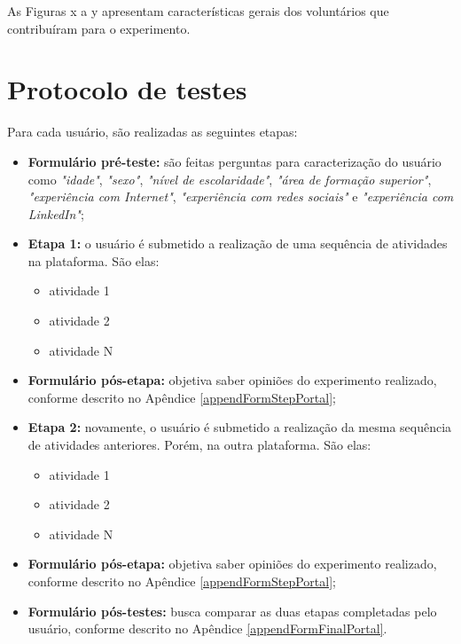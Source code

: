 \documentclass[cic,tc]{iiufrgs}
\begin{document}
As Figuras x a y apresentam características gerais dos voluntários que contribuíram para o experimento.

\section{Protocolo de testes}
\label{avaliacaoProtocolo}

Para cada usuário, são realizadas as seguintes etapas:

\begin{itemize}
    \item \textbf{Formulário pré-teste:} são feitas perguntas para caracterização do usuário como \textit{"idade"}, \textit{"sexo"}, \textit{"nível de escolaridade"}, \textit{"área de formação superior"}, \textit{"experiência com Internet"}, \textit{"experiência com redes sociais"} e \textit{"experiência com LinkedIn"};
    
    \item \textbf{Etapa 1:} o usuário é submetido a realização de uma sequência de atividades na plataforma. São elas:
        \begin{itemize}
            \item atividade 1
            \item atividade 2
            \item atividade N
        \end{itemize}
        
    \item \textbf{Formulário pós-etapa:} objetiva saber opiniões do experimento realizado, conforme descrito no Apêndice \ref{appendFormStepPortal};
    
    \item \textbf{Etapa 2:} novamente, o usuário é submetido a realização da mesma sequência de atividades anteriores. Porém, na outra plataforma. São elas:
        \begin{itemize}
            \item atividade 1
            \item atividade 2
            \item atividade N
        \end{itemize}
        
    \item \textbf{Formulário pós-etapa:} objetiva saber opiniões do experimento realizado, conforme descrito no Apêndice \ref{appendFormStepPortal};
    
    \item \textbf{Formulário pós-testes:} busca comparar as duas etapas completadas pelo usuário, conforme descrito no Apêndice \ref{appendFormFinalPortal}.
\end{itemize}
\end{document}
